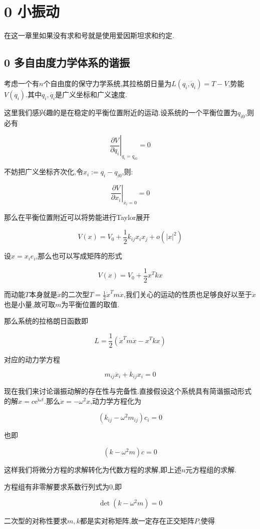 \documentclass[UTF8]{article}
\newcommand{\E}{\mathrm{e}}
\newcommand{\im}{\mathrm{i}}
\begin{document}
	
\section*{0 小振动}

在这一章里如果没有求和号就是使用爱因斯坦求和约定.

\subsection*{0 多自由度力学体系的谐振}

	考虑一个有$n$个自由度的保守力学系统,其拉格朗日量为$L(q_i,\dot{q}_i)=T-V$,势能$V(q_i)$.其中$q_i,\dot{q_i}$是广义坐标和广义速度.
	
	这里我们感兴趣的是在稳定的平衡位置附近的运动.设系统的一个平衡位置为$q_{i0}$,则必有
	
	\[\left.\frac{\partial V}{\partial q_i}\right|_{q_i=q_{i0}}=0\]
	
	不妨把广义坐标齐次化,令$x_i:=q_i-q_{i0}$,则:
	
	\[\left.\frac{\partial V}{\partial x_i}\right|_{x_i=0}=0\]
	
	那么在平衡位置附近可以将势能进行Taylor展开
	
	\[V(x)=V_0+\frac{1}{2}k_{ij}x_ix_j+o(|x|^2)\]
	
	设$x=x_ie_i$,那么也可以写成矩阵的形式
	
	\[V(x)=V_0+\frac12x^Tkx\]
	
	而动能$T$本身就是$\dot{x}$的二次型$T=\frac12\dot{x}^Tm\dot{x}$,我们关心的运动的性质也足够良好以至于$\dot{x}$也是小量,故可取$m$为平衡位置的取值.
	
	那么系统的拉格朗日函数即
	
	\[L=\frac12(\dot{x}^Tm\dot{x}-x^Tkx)\]
	
	对应的动力学方程
	
	\[m_{ij}\ddot{x_i}+k_{ij}x_i=0\]
	
	现在我们来讨论谐振动解的存在性与完备性.直接假设这个系统具有简谐振动形式的解$x=c\E^{\im \omega t}$.那么$\ddot{x}=-\omega^2 x$,动力学方程化为
	
	\[(k_{ij}-\omega^2m_{ij})c_i=0\]
	
	也即
	
	\[(k-\omega^2m)c=0\]
	
	这样我们将微分方程的求解转化为代数方程的求解,即上述$n$元方程组的求解.
	
	方程组有非零解要求系数行列式为0,即
	
	\[\det(k-\omega^2m)=0\]
	
	二次型的对称性要求$m,k$都是实对称矩阵,故一定存在正交矩阵$P$,使得
	
\end{document}
